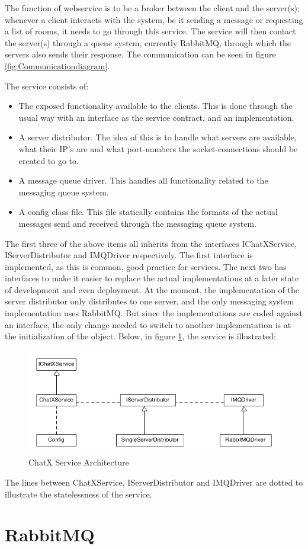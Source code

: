 The function of webservice is to be a broker between the client and the server(s); whenever a client interacts with the system, be it sending a message or requesting a list of rooms, it needs to go through this service. The service will then  contact the server(s) through a queue system, currently RabbitMQ, through which the servers also sends their response. The communication can be seen in figure \ref{fig:Communicationdiagram}.

The service consists of:
\begin{itemize}
 \item The exposed functionality available to the clients. This is done through the usual way with an interface as the service contract, and an implementation.

 \item A server distributor. The idea of this is to handle what servers are available, what their IP's are and what port-numbers the socket-connections should be created to go to. 
 
 \item A message queue driver. This handles all functionality related to the messaging queue system.
 
 \item A config class file. This file statically contains the formats of the actual messages send and received through the messaging queue system.

\end{itemize}

The first three of the above items all inherits from the interfaces IChatXService, IServerDistributor and IMQDriver respectively. The first interface is implemented, as this is common, good practice for services. The next two has interfaces to make it easier to replace the actual implementations at a later state of development and even deployment. At the moment, the implementation of the server distributor only distributes to one server, and the only messaging system implementation uses RabbitMQ. But since the implementations are coded against an interface, the only change needed to switch to another implementation is at the initialization of the object.
Below, in figure \ref{fig:ServiceArchitecture}, the service is illustrated:

\begin{figure}[h]
	\centering
	\includegraphics[width=0.7\linewidth]{img/ServiceArchitecture}
	\caption[Communication-diagram]{ChatX Service Architecture}
	\label{fig:ServiceArchitecture}
\end{figure}

The lines between ChatXService, IServerDistributor and IMQDriver are dotted to illustrate the statelessness of the service.

\section{RabbitMQ}